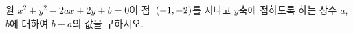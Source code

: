 원 $x^2+y^2-2ax+2y+b=0$이 점~$(-1{,}\mkern3mu\mathopen{}-2)$를 지나고 $y$축에 접하도록 하는 상수 $a$, $b$에 대하여 $b-a$의 값을 구하시오.
